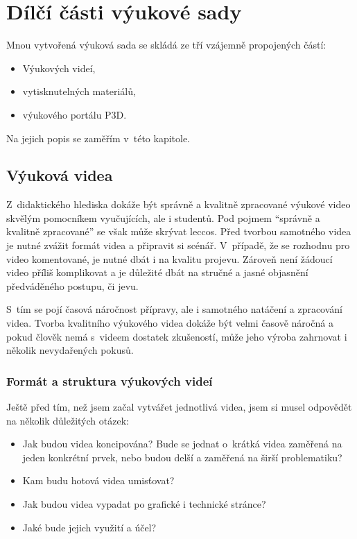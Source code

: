 \chapter{Dílčí části výukové sady}
Mnou vytvořená výuková sada se skládá ze tří vzájemně propojených částí:
\begin{itemize}[topsep=0pt]
    \setlength\itemsep{0em}
    \item Výukových videí,
    \item vytisknutelných materiálů,
    \item výukového portálu P3D.
\end{itemize}
Na jejich popis se zaměřím v~této kapitole.

\section{Výuková videa}
Z~didaktického hlediska dokáže být správně a kvalitně zpracované výukové video skvělým pomocníkem vyučujících, ale i studentů.
Pod pojmem \enquote{správně a kvalitně zpracované} se však může skrývat leccos.
Před tvorbou samotného videa je nutné zvážit formát videa a připravit si scénář.
V~případě, že se rozhodnu pro video komentované, je nutné dbát i na kvalitu projevu.
Zároveň není žádoucí video příliš komplikovat a je důležité dbát na stručné a jasné objasnění předváděného postupu, či jevu.

S~tím se pojí časová náročnost přípravy, ale i samotného natáčení a zpracování videa.
Tvorba kvalitního výukového videa dokáže být velmi časově náročná a pokud člověk nemá s~videem dostatek zkušeností, může jeho výroba zahrnovat i několik nevydařených pokusů.

\subsection{Formát a struktura výukových videí}
Ještě před tím, než jsem začal vytvářet jednotlivá videa, jsem si musel odpovědět na několik důležitých otázek:
\begin{itemize}[topsep=0pt]
    \setlength\itemsep{0em}
    \item Jak budou videa koncipována? Bude se jednat o~krátká videa zaměřená na jeden konkrétní prvek, nebo budou delší a zaměřená na širší problematiku?
    \item Kam budu hotová videa umisťovat?
    \item Jak budou videa vypadat po grafické i technické stránce?
    \item Jaké bude jejich využití a účel?
\end{itemize}

